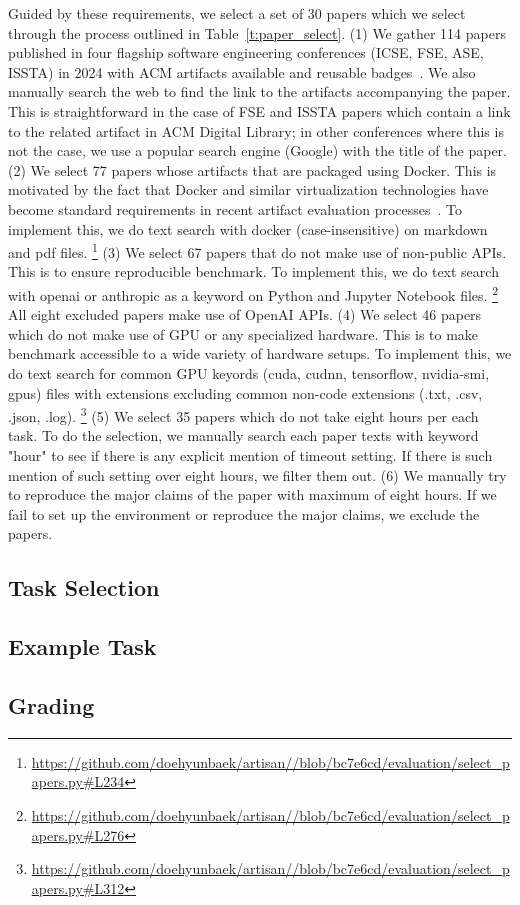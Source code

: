 Guided by these requirements, we select a set of 30 papers which we select through the process outlined in Table~\ref{t:paper_select}.
(1) We gather 114 papers published in four flagship software engineering conferences (ICSE, FSE, ASE, ISSTA) in 2024 with ACM artifacts available and reusable badges~\cite{acm-artifact-badging-v1_1}.
We also manually search the web to find the link to the artifacts accompanying the paper.
This is straightforward in the case of FSE and ISSTA papers which contain a link to the related artifact in ACM Digital Library; in other conferences where this is not the case, we use a popular search engine (Google) with the title of the paper.
(2) We select 77 papers whose artifacts that are packaged using Docker.
This is motivated by the fact that Docker and similar virtualization technologies
have become standard requirements in recent artifact evaluation processes~\cite{icse2024-ae,fse2024-ae,ase2024-ae}.
To implement this, we do text search with docker (case-insensitive) on markdown and pdf files.
\footnote{\url{https://github.com/doehyunbaek/artisan//blob/bc7e6cd/evaluation/select_papers.py\#L234}}
(3) We select 67 papers that do not make use of non-public APIs.
This is to ensure reproducible benchmark.
To implement this, we do text search with openai or anthropic as a keyword on Python and Jupyter Notebook files.
\footnote{\url{https://github.com/doehyunbaek/artisan//blob/bc7e6cd/evaluation/select_papers.py\#L276}}
All eight excluded papers make use of OpenAI APIs.
(4) We select 46 papers which do not make use of GPU or any specialized hardware.
This is to make benchmark accessible to a wide variety of hardware setups.
To implement this, we do text search for common GPU keyords (cuda, cudnn, tensorflow, nvidia-smi, gpus) files with extensions excluding common non-code extensions (.txt, .csv, .json, .log).
\footnote{\url{https://github.com/doehyunbaek/artisan//blob/bc7e6cd/evaluation/select_papers.py\#L312}}
(5) We select 35 papers which do not take eight hours per each task.
To do the selection, we manually search each paper texts with keyword "hour" to see if there is any explicit mention of timeout setting.
If there is such mention of such setting over eight hours, we filter them out.
(6) We manually try to reproduce the major claims of the paper with maximum of eight hours.
If we fail to set up the environment or reproduce the major claims, we exclude the papers.

\subsection{Task Selection}
\label{s:task_select}

\subsection{Example Task}
\label{s:task_example}

\subsection{Grading}
\label{s:grading}